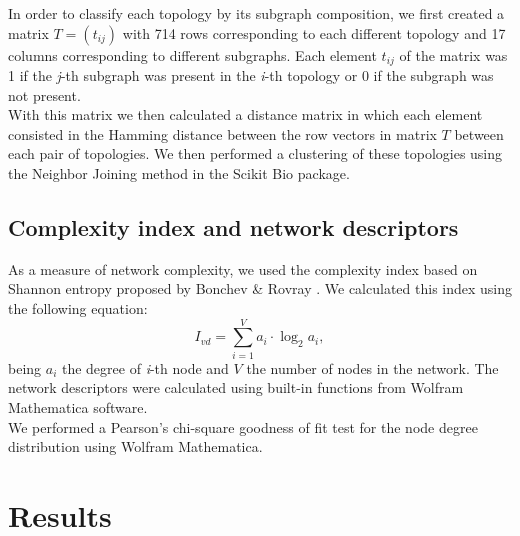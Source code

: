 \documentclass[10pt,letterpaper]{article}
\begin{document}
In order to classify each topology by its subgraph composition, we first created
a matrix  $T = (t_{ij})$ with 714 rows corresponding to each different topology
and 17 columns corresponding to different subgraphs. Each element $t_{ij}$ of
the matrix was 1 if the \emph{j}-th subgraph was present in the \emph{i}-th
topology or 0 if the subgraph was not present.\\

With this matrix we then calculated a distance matrix in which each element
consisted in the Hamming distance between the row vectors in matrix $T$ between
each pair of topologies. We then performed a clustering of these topologies
using the Neighbor Joining method in the Scikit Bio package.

\subsection*{Complexity index and network descriptors}

As a measure of network complexity, we used the complexity index based on
Shannon entropy proposed by Bonchev \& Rovray \cite{D.2005}. We calculated this
index using the following equation:
\begin{equation}
 I_{vd} = \sum_{i=1}^V a_i \cdot \log_{2} a_i,
\end{equation}
\noindent
being $a_i$ the degree of \emph{i}-th node and $V$ the number of nodes in the
network. The network descriptors were calculated using built-in functions from
Wolfram Mathematica software.\\

We performed a Pearson’s chi-square goodness of fit test for the node degree
distribution using Wolfram Mathematica.



\section*{Results}
\end{document}

